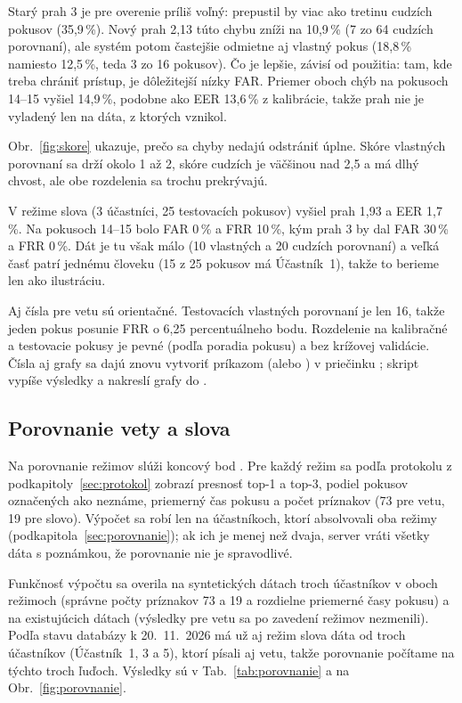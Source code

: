Starý prah 3 je pre overenie príliš voľný: prepustil by viac ako tretinu
cudzích pokusov (35,9\,\%). Nový prah 2,13 túto chybu zníži na 10,9\,\% (7 zo 64
cudzích porovnaní), ale systém potom častejšie odmietne aj vlastný pokus
(18,8\,\% namiesto 12,5\,\%, teda 3 zo 16 pokusov). Čo je lepšie, závisí od
použitia: tam, kde treba chrániť prístup, je dôležitejší nízky FAR. Priemer oboch
chýb na pokusoch 14--15 vyšiel 14,9\,\%, podobne ako EER 13,6\,\% z kalibrácie,
takže prah nie je vyladený len na dáta, z ktorých vznikol.

Obr.~\ref{fig:skore} ukazuje, prečo sa chyby nedajú odstrániť úplne. Skóre
vlastných porovnaní sa drží okolo 1 až 2, skóre cudzích je väčšinou nad 2,5
a má dlhý chvost, ale obe rozdelenia sa trochu prekrývajú.

V režime slova (3 účastníci, 25 testovacích pokusov) vyšiel prah 1,93 a EER
1,7\,\%. Na pokusoch 14--15 bolo FAR 0\,\% a FRR 10\,\%, kým prah 3 by dal FAR
30\,\% a FRR 0\,\%. Dát je tu však málo (10 vlastných a 20 cudzích porovnaní)
a veľká časť patrí jednému človeku (15 z 25 pokusov má Účastník~1), takže to
berieme len ako ilustráciu.

Aj čísla pre vetu sú orientačné. Testovacích vlastných porovnaní je len 16, takže
jeden pokus posunie FRR o 6,25 percentuálneho bodu. Rozdelenie na kalibračné
a testovacie pokusy je pevné (podľa poradia pokusu) a bez krížovej validácie.
Čísla aj grafy sa dajú znovu vytvoriť príkazom  (alebo
) v priečinku ; skript
vypíše výsledky a nakreslí grafy do .

\subsection{Porovnanie vety a slova}
\label{sec:test-porovnanie}

Na porovnanie režimov slúži koncový bod . Pre každý režim sa podľa protokolu z
podkapitoly~\ref{sec:protokol} zobrazí presnosť top-1 a top-3, podiel pokusov
označených ako neznáme, priemerný čas pokusu a počet príznakov (73 pre vetu,
19 pre slovo). Výpočet sa robí len na účastníkoch, ktorí absolvovali oba
režimy (podkapitola~\ref{sec:porovnanie}); ak ich je menej než dvaja,
server vráti všetky dáta s poznámkou, že porovnanie nie je spravodlivé.

Funkčnosť výpočtu sa overila na syntetických dátach troch účastníkov v oboch
režimoch (správne počty príznakov 73 a 19 a rozdielne priemerné časy pokusu)
a na existujúcich dátach (výsledky pre vetu sa po zavedení režimov nezmenili).
Podľa stavu databázy k 20.~11.~2026 má už aj režim slova dáta od troch
účastníkov (Účastník~1, 3 a 5), ktorí písali aj vetu, takže porovnanie
počítame na týchto troch ľuďoch. Výsledky sú v Tab.~\ref{tab:porovnanie} a na Obr.~\ref{fig:porovnanie}.


